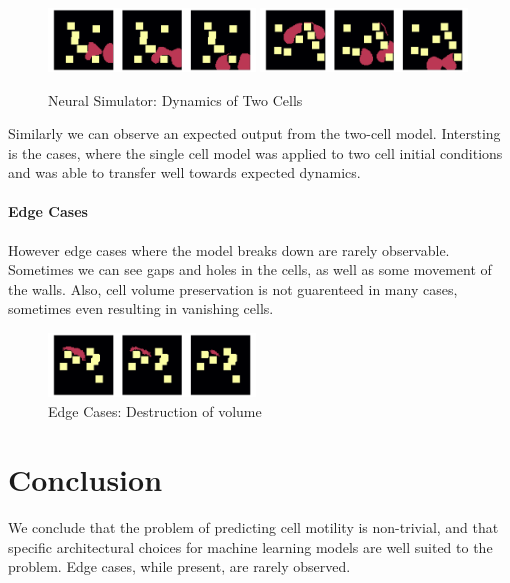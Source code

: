 \documentclass[a4paper,10pt,twocolumn]{article}
\begin{document}
            \begin{figure}[H]\centering
                \includegraphics[width=0.49\textwidth]{../images/run_22.png}
                \includegraphics[width=0.49\textwidth]{../images/run_12.png}
                \caption{Neural Simulator: Dynamics of Two Cells}
            \end{figure}
            Similarly we can observe an expected output from the two-cell model.
            Intersting is the cases, where the single cell model was applied to two cell initial conditions
            and was able to transfer well towards expected dynamics.
            
            \paragraph{Edge Cases}
            However edge cases where the model breaks down are rarely observable.
            Sometimes we can see gaps and holes in the cells, as well as some movement of the walls.
            Also, cell volume preservation is not guarenteed in many cases, sometimes even resulting in vanishing cells.
            \begin{figure}[H]\centering
                \includegraphics[width=0.49\textwidth]{../images/run_5.png}
                \caption{Edge Cases: Destruction of volume}
            \end{figure}

    \section{Conclusion}
        We conclude that the problem of predicting cell motility is non-trivial, and that
        specific architectural choices for machine learning models are well suited to the problem.
        Edge cases, while present, are rarely observed.
\end{document}
